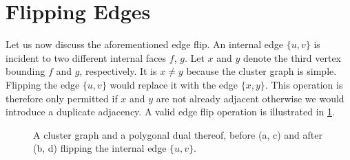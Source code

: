 \section{Flipping Edges}
\label{sect:flipping-edges}

Let us now discuss the aforementioned edge flip. An internal edge $\{u,v\}$ is incident to two different internal faces $f$, $g$. Let $x$ and $y$ denote the third vertex bounding $f$ and $g$, respectively. It is $x \neq y$ because the cluster graph is simple. Flipping the edge $\{u,v\}$ would replace it with the edge $\{x,y\}$. This operation is therefore only permitted if $x$ and $y$ are not already adjacent \emdash{} otherwise we would introduce a duplicate adjacency. A valid edge flip operation is illustrated in \cref{fig:flip-edge-example-internal}.


\begin{figure}[H]
	\centering
	\quad
	\qquad
	\quad
	\caption{A cluster graph and a polygonal dual thereof, before (a, c) and after (b, d) flipping the internal edge $\{u,v\}$.}
	\label{fig:flip-edge-example-internal}
\end{figure}

